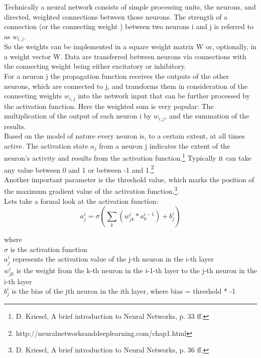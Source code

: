 \documentclass[12pt]{article}
\begin{document}
   Technically a neural network consists of simple processing units, the
   neurons, and directed, weighted connections between those neurons. The strength of a connection (or the connecting weight ) between two neurons
   i and j is referred to as \(w_{i, j}\).\\
   So the weights can be implemented in a square weight matrix W or, optionally, in a weight vector W. Data are transferred between neurons via
   connections with the connecting weight being either excitatory or inhibitory.\\
   For a neuron j the propagation function receives the outputs of the other neurons, which are connected to j, and transforms them in consideration of the connecting weights \(w_{i, j}\) into the network input that can be further processed by the activation function. Here the weighted sum is very popular: The multiplication of the output of each neuron i by \(w_{i, j}\), and the summation of the results.\\  
   Based on the model of nature every neuron is, to a certain extent, at all times active. The activation state \(a_j\) from a neuron j indicates the extent of the neuron’s activity and results from the activation function.\footnote{D. Kriesel, A brief introduction to Neural Networks, p. 33 ff.} Typically it can take any value between 0 and 1 or between -1 and 1.\footnote{http://neuralnetworksanddeeplearning.com/chap1.html} \\ 
   Another important parameter is the threshold value, which marks the position of the maximum gradient value of the activation function.\footnote{D. Kriesel, A brief introduction to Neural Networks, p. 36 ff.}. \\
   
   Lets take a formal look at the activation function:\\
   
   \[ a^i_j = \sigma (\sum_k (w_{jk}^i * a^{i-1}_k) + b^i_j) \] 
   
   where\\
   \( \sigma \) is the activation function \\
   \( a^i_j \) represents the activation value of the j-th neuron in the i-th layer\\
   \( w_{jk}^i \)  is the weight from the k-th neuron in the i-1-th layer to the j-th neuron in the i-th layer \\
   \( b^i_j\) is the bias of the jth neuron in the ith layer, where bias = threshold * -1\\
   
\end{document}
